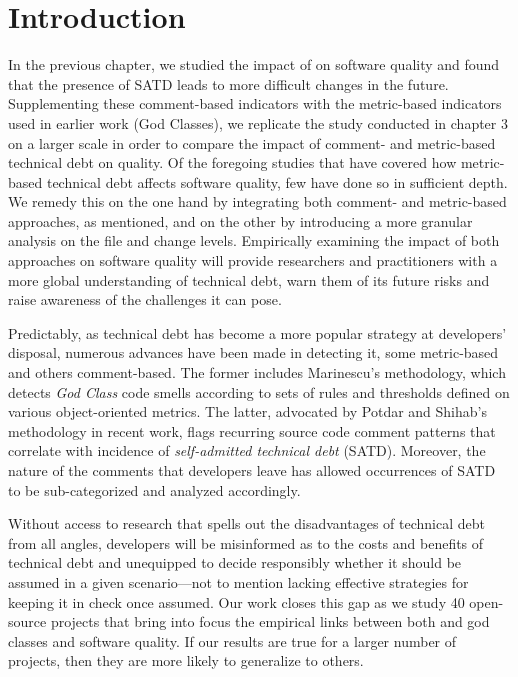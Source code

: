 \section{Introduction}
\label{chap4:sec:introduction}
\setlength\parindent{24pt} 

In the previous chapter, we studied the impact of \SATD on software quality and found that the presence of SATD leads to more difficult changes in the future. Supplementing these comment-based indicators with the metric-based indicators used in earlier work  (God Classes), we replicate the study conducted in chapter 3 on a larger scale in order to compare the impact of comment- and metric-based technical debt on quality. Of the foregoing studies that have covered how metric-based technical debt affects software quality, few have done so in sufficient depth. We remedy this on the one hand by integrating both comment- and metric-based approaches, as mentioned, and on the other by introducing a more granular analysis on the file and change levels. Empirically examining the impact of both approaches on software quality will provide researchers and practitioners with a more global understanding of technical debt, warn them of its future risks and raise awareness of the challenges it can pose.

Predictably, as technical debt has become a more popular strategy at developers' disposal, numerous advances have been made in detecting it, some metric-based and others comment-based. The former includes Marinescu's \cite{marinescu2004detection} methodology, which detects \textit{God Class} code smells according to sets of rules and thresholds defined on various object-oriented metrics. The latter, advocated by Potdar and Shihab's \cite{ICSM_PotdarS14} methodology in recent work, flags recurring source code comment patterns that correlate with incidence of \textit{self-admitted technical debt} (SATD). Moreover, the nature of the comments that developers leave has allowed occurrences of SATD to be sub-categorized and analyzed accordingly.

Without access to research that spells out the disadvantages of technical debt from all angles, developers will be misinformed as to the costs and benefits of technical debt and unequipped to decide responsibly whether it should be assumed in a given scenario---not to mention lacking effective strategies for keeping it in check once assumed. Our work closes this gap as we study 40 open-source projects that bring into focus the empirical links between both \SATD and god classes and software quality. If our results are true for a larger number of projects, then they are more likely to generalize to others. 

